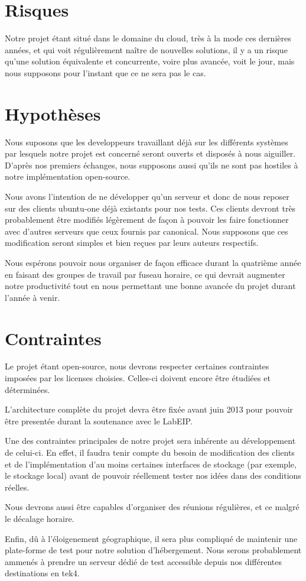 \section{Risques}
Notre projet étant situé dans le domaine du cloud, très à la mode ces dernières années, et qui voit régulièrement naître de nouvelles solutions, il y a un risque qu'une solution équivalente et concurrente, voire plus avancée, voit le jour, mais nous supposons pour l'instant que ce ne sera pas le cas.

\section{Hypothèses}
Nous suposons que les developpeurs travaillant déjà sur les différents systèmes par lesquels notre projet est concerné seront ouverts et disposés à nous aiguiller. D'après nos premiers échanges, nous supposons aussi qu'ils ne sont pas hostiles à notre implémentation open-source.

Nous avons l'intention de ne développer qu'un serveur et donc de nous reposer sur des clients ubuntu-one déjà existants pour nos tests. Ces clients devront très probablement être modifiés légèrement de façon à pouvoir les faire fonctionner avec d'autres serveurs que ceux fournis par canonical. Nous supposons que ces modification seront simples et bien reçues par leurs auteurs respectifs.

Nous espérons pouvoir nous organiser de façon efficace durant la quatrième année en faisant des groupes de travail par fuseau horaire, ce qui devrait augmenter notre productivité tout en nous permettant une bonne avancée du projet durant l'année à venir.

\section{Contraintes}
Le projet étant open-source, nous devrons respecter certaines contraintes imposées par les licenses choisies. Celles-ci doivent encore être étudiées et déterminées.

L'architecture complète du projet devra être fixée avant juin 2013 pour pouvoir être presentée durant la soutenance avec le LabEIP.

Une des contraintes principales de notre projet sera inhérente au développement de celui-ci. En effet, il faudra tenir compte du besoin de modification des clients et de l'implémentation d'au moins certaines interfaces de stockage (par exemple, le stockage local) avant de pouvoir réellement tester nos idées dans des conditions réelles.

Nous devrons aussi être capables d'organiser des réunions régulières, et ce malgré le décalage horaire.

Enfin, dû à l'éloigenement géographique, il sera plus compliqué de maintenir une plate-forme de test pour notre solution d'hébergement. Nous serons probablement ammenés à prendre un serveur dédié de test accessible depuis nos différentes destinations en tek4.

